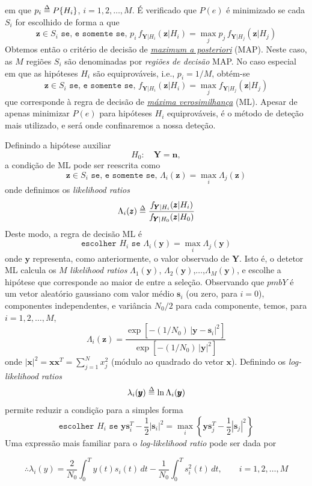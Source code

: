 em que $p_i \delequal P\{H_i\}$, $i=1,2,\dots,M$. É verificado que $P(e)$ é minimizado se cada $S_i$ for escolhido de forma a que
$$
    \pmb{z} \in S_i \texttt{ se, e somente se, } p_i\, f_{\pmb{Y} | H_i}(\pmb{z}|H_i) = \max_{j} p_j\, f_{\pmb{Y} | H_j}(\pmb{z}|H_j)
$$
Obtemos então o critério de decisão de \underline{\textit{maximum a posteriori}} (MAP). Neste caso, as $M$ regiões $S_i$ são denominadas por \textit{regiões de decisão} MAP. No caso especial em que as hipóteses $H_i$ são equiprováveis, i.e., $p_i = 1/M$, obtém-se
$$
    \pmb{z} \in S_i \texttt{ se, e somente se, } f_{\pmb{Y} | H_i}(\pmb{z}|H_i) = \max_{j} f_{\pmb{Y} | H_j}(\pmb{z}|H_j)
$$
que corresponde à regra de decisão de \underline{\textit{máxima verosimilhança}} (ML). Apesar de apenas minimizar $P(e)$ para hipóteses $H_i$ equiprováveis, é o método de deteção mais utilizado, e será onde confinaremos a nossa deteção.

Definindo a hipótese auxiliar
$$
    H_0:\quad \pmb{Y} = \pmb{n},
$$
a condição de ML pode ser reescrita como
$$
    \pmb{z} \in S_i \texttt{ se, e somente se, } \Lambda_i(\pmb{z}) = \max_{i} \Lambda_j(\pmb{z})
$$
onde definimos os \textit{likelihood ratios}
$$
    \Lambda_i(\pmb{z}) \delequal \frac{f_{\pmb{Y} | H_i}(\pmb{z}|H_i)}{f_{\pmb{Y} | H_0}(\pmb{z}|H_0)}
$$
Deste modo, a regra de decisão ML é
$$
    \texttt{escolher } H_i \texttt{ se } \Lambda_i(\pmb{y}) = \max_{i} \Lambda_j(\pmb{y})
$$
onde $\pmb{y}$ representa, como anteriormente, o valor observado de $\pmb{Y}$. Isto é, o detetor ML calcula os $M$ \textit{likelihood ratios} $\Lambda_1(\pmb{y})$, $\Lambda_2(\pmb{y})$,$\dots$,$\Lambda_M(\pmb{y})$, e escolhe a hipótese que corresponde ao maior de entre a seleção. Observando que $pmb{Y}$ é um vetor aleatório gaussiano com valor médio $\pmb{s}_i$ (ou zero, para $i=0$), componentes independentes, e variância $N_0/2$ para cada componente, temos, para $i=1,2,\dots,M$,
$$
    \Lambda_i(\pmb{z}) = \frac{\exp[-(1/N_0)\, |\pmb{y}-\pmb{s}_i|^2]}{\exp[-(1/N_0)\, |\pmb{y}|^2]}
$$
onde $|\pmb{x}|^2 = \pmb{x}\pmb{x}^T = \sum_{j=1}^{N} x^2_j$ (módulo ao quadrado do vetor $\pmb{x}$). Definindo os \textit{log-likelihood ratios}
$$
    \lambda_i(\pmb{y}) \delequal \ln{\Lambda_i(\pmb{y})}
$$
permite reduzir a condição para a simples forma
$$
    \texttt{escolher } H_i \texttt{ se } \pmb{y}\pmb{s}_i^T - \frac{1}{2} |\pmb{s}_i|^2 = \max_{i}\left\{ \pmb{y}\pmb{s}_j^T - \frac{1}{2} |\pmb{s}_j|^2 \right\} 
$$
Uma expressão mais familiar para o \textit{log-likelihood ratio} pode ser dada por 
\begin{mdframed}
$$
    \therefore \lambda_i(y) = \frac{2}{N_0} \int_{0}^{T} y(t) s_i(t)\, dt - \frac{1}{N_0} \int_{0}^{T} s_i^2(t)\, dt,\qquad i=1,2,\dots,M
$$
\end{mdframed}

